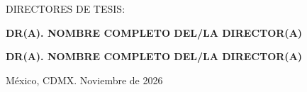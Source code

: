 \begin{titlepage}
\begin{minipage}[t][\dimexpr\textheight-1cm][t]{14.4cm}
  \vspace{0.8cm}
  {\normalsize DIRECTORES DE TESIS:\par}
  \vspace{0.15cm}
  {\normalsize\bfseries DR(A). NOMBRE COMPLETO DEL/LA DIRECTOR(A)\par}
  {\normalsize\bfseries DR(A). NOMBRE COMPLETO DEL/LA DIRECTOR(A)\par}

  \vfill
  {\normalsize México, CDMX. \hfill Noviembre de 2026\par}
\end{minipage}
\restoregeometry
\end{titlepage}
